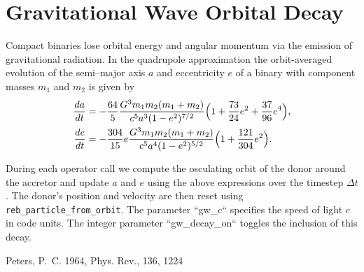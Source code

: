 \section{Gravitational Wave Orbital Decay}
\label{sec:gw_decay}

Compact binaries lose orbital energy and angular momentum via the emission of gravitational radiation.  In the quadrupole approximation the orbit-averaged evolution of the semi--major axis $a$ and eccentricity $e$ of a binary with component masses $m_1$ and $m_2$ is given by \citet{Peters1964}
\begin{align}
  \frac{da}{dt} &= -\frac{64}{5}\frac{G^3 m_1 m_2 (m_1+m_2)}{c^5 a^3 (1-e^2)^{7/2}}\Bigl(1+\frac{73}{24}e^2+\frac{37}{96}e^4\Bigr),\\
  \frac{de}{dt} &= -\frac{304}{15}e\frac{G^3 m_1 m_2 (m_1+m_2)}{c^5 a^4 (1-e^2)^{5/2}}\Bigl(1+\frac{121}{304}e^2\Bigr).
\end{align}

During each operator call we compute the osculating orbit of the donor around the accretor and update $a$ and $e$ using the above expressions over the timestep $\Delta t$.  The donor's position and velocity are then reset using \texttt{reb\_particle\_from\_orbit}.  The parameter ``gw\_c`` specifies the speed of light $c$ in code units.  The integer parameter ``gw\_decay\_on`` toggles the inclusion of this decay.



\begin{thebibliography}{99}
 Peters, P.~C. 1964, Phys. Rev., 136, 1224
\end{thebibliography}

